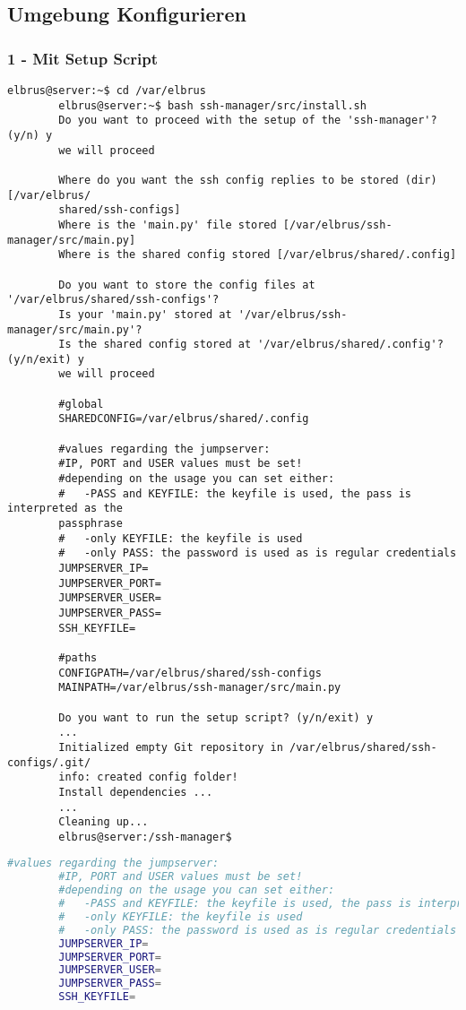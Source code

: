 	\subsection[file config]{Umgebung Konfigurieren}
	\subsubsection{1 - Mit Setup Script}
	
	\lstset{style=commands}
	\begin{lstlisting}[caption={Ausführen des 'install.sh' Scripts.}]
		elbrus@server:~$ cd /var/elbrus
		elbrus@server:~$ bash ssh-manager/src/install.sh
		Do you want to proceed with the setup of the 'ssh-manager'? (y/n) y
		we will proceed
		
		Where do you want the ssh config replies to be stored (dir) [/var/elbrus/
		shared/ssh-configs]
		Where is the 'main.py' file stored [/var/elbrus/ssh-manager/src/main.py]
		Where is the shared config stored [/var/elbrus/shared/.config]
		
		Do you want to store the config files at '/var/elbrus/shared/ssh-configs'?
		Is your 'main.py' stored at '/var/elbrus/ssh-manager/src/main.py'?
		Is the shared config stored at '/var/elbrus/shared/.config'? (y/n/exit) y
		we will proceed
		
		#global
		SHAREDCONFIG=/var/elbrus/shared/.config
		
		#values regarding the jumpserver:
		#IP, PORT and USER values must be set!
		#depending on the usage you can set either:
		#   -PASS and KEYFILE: the keyfile is used, the pass is interpreted as the
		passphrase
		#   -only KEYFILE: the keyfile is used
		#   -only PASS: the password is used as is regular credentials
		JUMPSERVER_IP=
		JUMPSERVER_PORT=
		JUMPSERVER_USER=
		JUMPSERVER_PASS=
		SSH_KEYFILE=
		
		#paths
		CONFIGPATH=/var/elbrus/shared/ssh-configs
		MAINPATH=/var/elbrus/ssh-manager/src/main.py
		
		Do you want to run the setup script? (y/n/exit) y
		...
		Initialized empty Git repository in /var/elbrus/shared/ssh-configs/.git/
		info: created config folder!
		Install dependencies ...
		...
		Cleaning up...
		elbrus@server:/ssh-manager$
	\end{lstlisting}
	\newpage
	
	\lstset{style=files}
	\begin{lstlisting}[caption={Ergänzen der fehlenden Werten in '.env'.}, language=bash]
		#values regarding the jumpserver:
		#IP, PORT and USER values must be set!
		#depending on the usage you can set either:
		#   -PASS and KEYFILE: the keyfile is used, the pass is interpreted as the passphrase
		#   -only KEYFILE: the keyfile is used
		#   -only PASS: the password is used as is regular credentials
		JUMPSERVER_IP=
		JUMPSERVER_PORT=
		JUMPSERVER_USER=
		JUMPSERVER_PASS=
		SSH_KEYFILE=
	\end{lstlisting}
	
